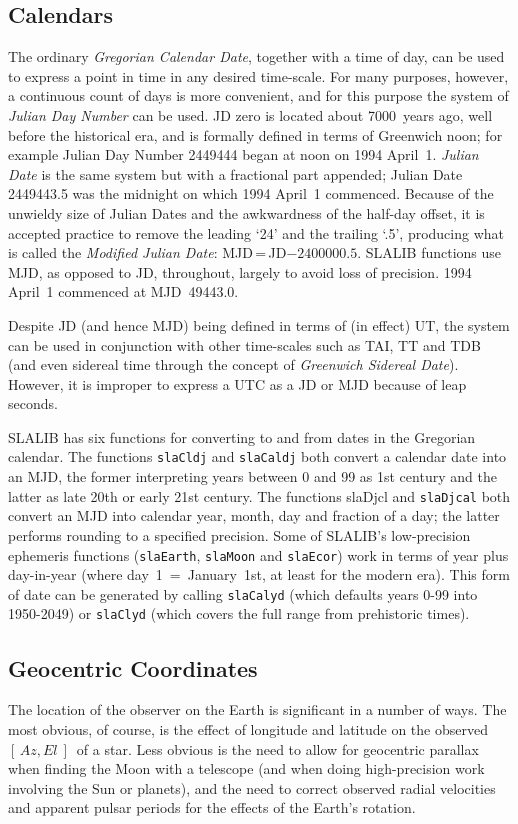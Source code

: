\documentclass[11pt,fleqn,twoside]{article}
\renewcommand{\_}{{\tt\char'137}}     %
\newcommand{\azel}      {$[\,Az,El~]$}
\begin{document}
\subsection{Calendars}
The ordinary {\it Gregorian Calendar Date},
together with a time of day, can be
used to express a point in time in any desired time-scale.
For many purposes,
however, a continuous count of days is more convenient, and for
this purpose the system of {\it Julian Day Number}\/ can be used.
JD zero is located about 7000~years ago, well before the
historical era, and is formally defined in terms of Greenwich noon;
for example Julian Day Number 2449444 began at noon
on 1994 April~1.  {\it Julian Date}\/
is the same system but with a fractional part appended;
Julian Date 2449443.5 was the midnight on which 1994 April~1
commenced.  Because of the unwieldy size of Julian Dates
and the awkwardness of the half-day offset, it is
accepted practice to remove the leading `24' and the trailing `.5',
producing what is called the {\it Modified Julian Date}:
MJD\,=\,JD$-2400000.5$.  SLALIB functions use MJD, as opposed to
JD, throughout, largely to avoid loss of precision.
1994 April~1 commenced at MJD~49443.0.
 
Despite JD (and hence MJD) being defined in terms of (in effect)
UT, the system can be used in conjunction with other time-scales
such as TAI, TT and TDB (and even sidereal time through the
concept of {\it Greenwich Sidereal Date}).  However, it is improper
to express a UTC as a JD or MJD because of leap seconds.
 
SLALIB has six functions for converting to and from dates in
the Gregorian calendar.  The functions
{\tt slaCldj}
and
{\tt slaCaldj}
both convert a calendar date into an MJD, the former interpreting
years between 0 and 99 as 1st century and the latter as late 20th or
early 21st century.  The functions slaDjcl
and
{\tt slaDjcal}
both convert an MJD into calendar year, month, day and fraction of a day;
the latter performs rounding to a specified precision.
Some of SLALIB's low-precision ephemeris functions
({\tt slaEarth},
{\tt slaMoon}
and
{\tt slaEcor})
work in terms of year plus day-in-year (where
day~1~=~January~1st, at least for the modern era).
This form of date can be generated by
calling
{\tt slaCalyd}
(which defaults years 0-99 into 1950-2049)
or
{\tt slaClyd}
(which covers the full range from prehistoric times).

\subsection{Geocentric Coordinates}
The location of the observer on the Earth is significant in a
number of ways.  The most obvious, of course, is the effect of
longitude and latitude
on the observed \azel\ of a star.  Less obvious is the need to
allow for geocentric parallax when finding the Moon with a
telescope (and when doing high-precision work involving the
Sun or planets), and the need to correct observed radial
velocities and apparent pulsar periods for the effects
of the Earth's rotation.
 
\end{document}
